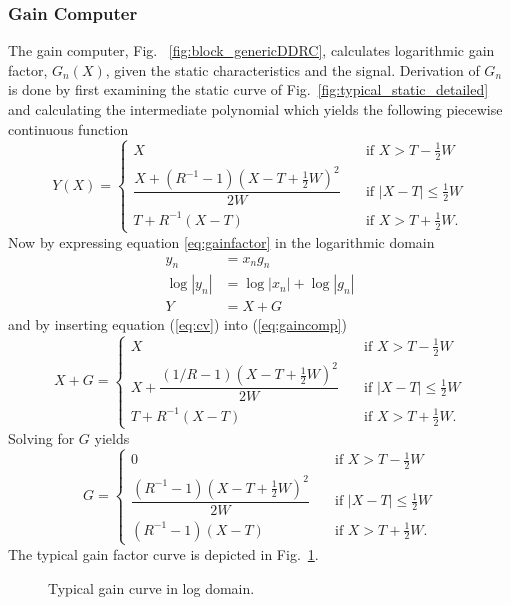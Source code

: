 \documentclass[../main2.tex]{subfiles}
\providecommand{\rootdir}{..}
\begin{document}
\subsubsection{Gain Computer} \label{gain_computer}
The gain computer, Fig. ~\ref{fig:block_genericDDRC}, calculates logarithmic gain factor, $G_n(X)$, given the static characteristics and the signal. Derivation of $G_n$ is done by first examining the static curve of Fig.~\ref{fig:typical_static_detailed} and calculating the intermediate polynomial which yields the following piecewise continuous function
\begin{equation} \label{eq:gaincomp}
Y(X) = \begin{cases}
    X & \quad \text{if }X> T-\frac{1}{2}W \\[0.8em]
    \dfrac{X+(R^{-1}-1)(X-T+\frac{1}{2}W)^2}{2W}& \quad \text{if } |X-T| \leq \frac{1}{2}W\\[1.2em]
    T+ R^{-1}(X-T) & \quad \text{if } X > T + \frac{1}{2}W.
\end{cases}
\end{equation}
Now  by expressing equation \eqref{eq:gainfactor} in the logarithmic domain
\begin{align}
y_n &= x_ng_n   \\
\log|y_n| & = \log|x_n| + \log|g_n|   \\
Y &= X + G \label{eq:cv}
\end{align}
and by inserting equation (\ref{eq:cv}) into (\ref{eq:gaincomp})
\begin{equation}
X+G = \begin{cases}
    X & \quad \text{if }X > T-\frac{1}{2}W \\[0.8em]
    X + \dfrac{(1/R-1)(X-T+\frac{1}{2}W)^2}{2W}& \quad \text{if } |X-T| \leq \frac{1}{2}W\\[1.2em]
    T+ R^{-1}(X-T) & \quad \text{if } X > T + \frac{1}{2}W.
\end{cases}
\end{equation}
Solving for $G$ yields
\begin{equation} \label{eq:c}
G = \begin{cases}
    0 & \quad \text{if }X >T -\frac{1}{2}W \\[0.8em]
    \dfrac{(R^{-1}-1)(X-T+\frac{1}{2}W)^2}{2W}& \quad \text{if } |X-T| \leq \frac{1}{2}W\\[1.2em]
    \left(R^{-1}-1\right)\left(X-T\right) & \quad \text{if } X > T + \frac{1}{2}W.
 \end{cases}
\end{equation}
The typical gain factor curve is depicted in Fig.~\ref{fig:typical_gain_detailed}.
\begin{figure}[h]
\centerline{}
\caption{Typical gain curve in log domain.}
\label{fig:typical_gain_detailed}
\end{figure}
\end{document}
